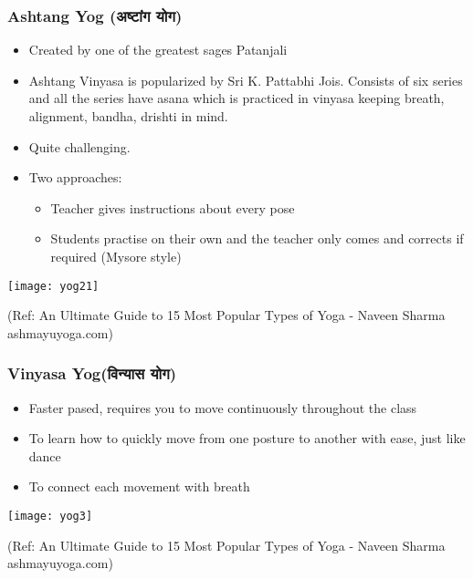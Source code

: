 \begin{frame}[fragile]\frametitle{Ashtang Yog (अष्टांग योग)}
	\begin{itemize}
	\item Created by one of the greatest sages Patanjali
	\item Ashtang Vinyasa is popularized by Sri K. Pattabhi Jois. Consists of six series and all the series have asana which is practiced in vinyasa keeping breath, alignment, bandha, drishti in mind.
	\item Quite challenging.
	\item Two approaches:
	\begin{itemize}
	\item Teacher gives instructions about every pose
	\item Students practise on their own and the teacher only comes and corrects if required (Mysore style)
	
	\end{itemize}
	\end{itemize}

\begin{center}
\texttt{[image: yog21]}

\tiny{(Ref: An Ultimate Guide to 15 Most Popular Types of Yoga - Naveen Sharma ashmayuyoga.com)}
\end{center}

\end{frame}

\begin{frame}[fragile]\frametitle{Vinyasa Yog(विन्यास योग)}

	\begin{itemize}
	\item Faster pased, requires you to move continuously throughout the class
	\item To learn how to quickly move from one posture to another with ease, just like dance
	\item To connect each movement with breath
	\end{itemize}

\begin{center}
\texttt{[image: yog3]}

\tiny{(Ref: An Ultimate Guide to 15 Most Popular Types of Yoga - Naveen Sharma ashmayuyoga.com)}
\end{center}

\end{frame}


